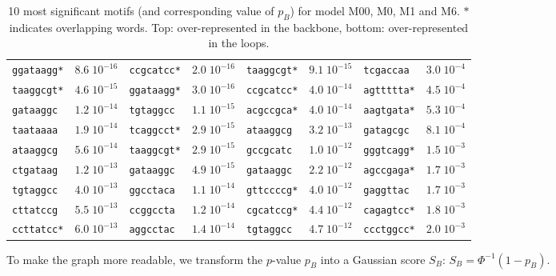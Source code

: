 \documentclass[dvips, lscape]{foils}
\newcommand{\textblue}[1]{\textcolor{blue}{#1}}
\newcommand{\paragraph}[1]{\noindent {\textblue{#1}}}
\begin{document}
\begin{table}[h]
\begin{center}
{\begin{tabular}{llllllll}
 {\tt ggataagg*} & $8.6\;10^{-16}$  &  {\tt ccgcatcc*} & $2.0\;10^{-16}$  &  {\tt taaggcgt*} & $9.1\;10^{-15}$  &  {\tt tcgaccaa~} & $3.0\;10^{-4}$ \\
 {\tt taaggcgt*} & $4.6\;10^{-15}$  &  {\tt ggataagg*} & $3.0\;10^{-16}$  &  {\tt ccgcatcc*} & $4.0\;10^{-14}$  &  {\tt agttttta*} & $4.5\;10^{-4}$ \\
 {\tt gataaggc~} & $1.2\;10^{-14}$  &  {\tt tgtaggcc~} & $1.1\;10^{-15}$  &  {\tt acgccgca*} & $4.0\;10^{-14}$  &  {\tt aagtgata*} & $5.3\;10^{-4}$ \\
 {\tt taataaaa~} & $1.9\;10^{-14}$  &  {\tt tcaggcct*} & $2.9\;10^{-15}$  &  {\tt ataaggcg~} & $3.2\;10^{-13}$  &  {\tt gatagcgc~} & $8.1\;10^{-4}$ \\
 {\tt ataaggcg~} & $5.6\;10^{-14}$  &  {\tt taaggcgt*} & $2.9\;10^{-15}$  &  {\tt gccgcatc~} & $1.0\;10^{-12}$  &  {\tt gggtcagg*} & $1.5\;10^{-3}$ \\
 {\tt ctgataag~} & $1.2\;10^{-13}$  &  {\tt gataaggc~} & $4.9\;10^{-15}$  &  {\tt gataaggc~} & $2.2\;10^{-12}$  &  {\tt agccgaga*} & $1.7\;10^{-3}$ \\
 {\tt tgtaggcc~} & $4.0\;10^{-13}$  &  {\tt ggcctaca~} & $1.1\;10^{-14}$  &  {\tt gttccccg*} & $4.0\;10^{-12}$  &  {\tt gaggttac~} & $1.7\;10^{-3}$ \\
 {\tt cttatccg~} & $5.5\;10^{-13}$  &  {\tt ccggccta~} & $1.2\;10^{-14}$  &  {\tt cgcatccg*} & $4.4\;10^{-12}$  &  {\tt cagagtcc*} & $1.8\;10^{-3}$ \\
 {\tt ccttatcc*} & $6.0\;10^{-13}$  &  {\tt aggcctac~} & $1.4\;10^{-14}$  &  {\tt tgtaggcc~} & $4.7\;10^{-12}$  &  {\tt ccctggcc*} & $2.0\;10^{-3}$ \\
      \end{tabular}
      }
    \caption{10 most significant motifs (and corresponding value of
      $p_B$) for model M00, M0, M1 and M6. $*$ indicates overlapping
      words. Top: over-represented in the backbone, bottom:
      over-represented in the loops.} 
    \label{Tab:Top20-pB}
    \end{center}
\end{table}

\paragraph{LRT versus binomial.} 
To make the graph more readable, we transform the $p$-value $p_B$ into
a Gaussian score $S_B$:
$
S_B = \Phi^{-1}(1-p_B).
$

\begin{center}
\end{center}
\end{document}
